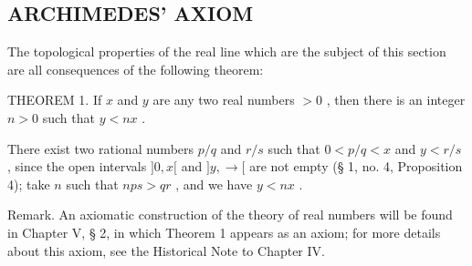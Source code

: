 \subsection{ARCHIMEDES' AXIOM}

The topological properties of the real line which are the subject of this section are all consequences of the following theorem:

THEOREM 1. If \(x\) and \(y\) are any two real numbers \(>0\) , then there is an integer \(n > 0\) such that \(y < nx\) .

There exist two rational numbers \(p / q\) and \(r / s\) such that \(0 < p / q < x\) and \(y < r / s\) , since the open intervals \(]0, x[\) and \(]y, \rightarrow[\) are not empty (§ 1, no. 4, Proposition 4); take \(n\) such that \(nps > qr\) , and we have \(y < nx\) .

Remark. An axiomatic construction of the theory of real numbers will be found in Chapter V, § 2, in which Theorem 1 appears as an axiom; for more details about this axiom, see the Historical Note to Chapter IV.

